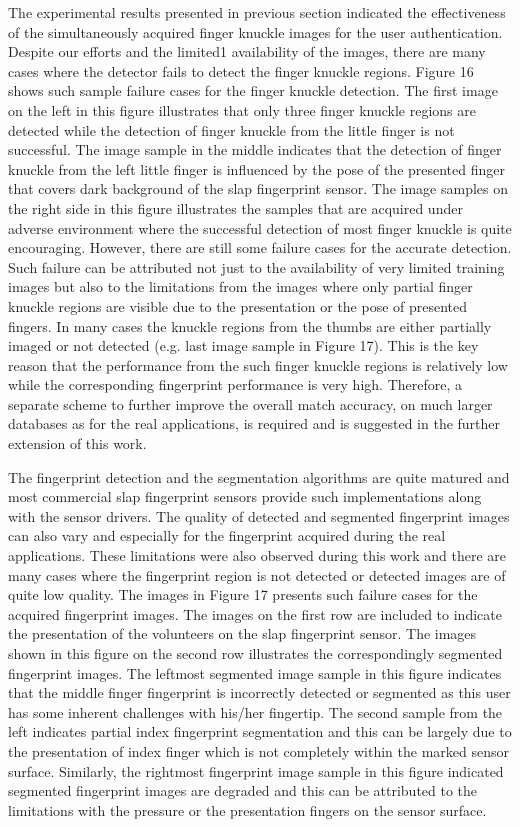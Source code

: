 The experimental results presented in previous section indicated the effectiveness of the simultaneously acquired finger knuckle images for the user authentication. Despite our efforts and the limited1 availability of the images, there are many cases where the detector fails to detect the finger knuckle regions. Figure 16 shows such sample failure cases for the finger knuckle detection. The first image on the left in this figure illustrates that only three finger knuckle regions are detected while the detection of finger knuckle from the little finger is not successful. The image sample in the middle indicates that the detection of finger knuckle from the left little finger is influenced by the pose of the presented finger that covers dark background of the slap fingerprint sensor. The image samples on the right side in this figure illustrates the samples that are acquired under adverse environment where the successful detection of most finger knuckle is quite encouraging. However, there are still some failure cases for the accurate detection. Such failure can be attributed not just to the availability of very limited training images but also to the limitations from the images where only partial finger knuckle regions are visible due to the presentation or the pose of presented fingers.  In many cases the knuckle regions from the thumbs are either partially imaged or not detected (e.g. last image sample in Figure 17). This is the key reason that the performance from the such finger knuckle regions is relatively low while the corresponding fingerprint performance is very high. Therefore, a separate scheme to further improve the overall match accuracy, on much larger databases as for the real applications, is required and is suggested in the further extension of this work.

The fingerprint detection and the segmentation algorithms are quite matured and most commercial slap fingerprint sensors provide such implementations along with the sensor drivers. The quality of detected and segmented fingerprint images can also vary and especially for the fingerprint acquired during the real applications. These limitations were also observed during this work and there are many cases where the fingerprint region is not detected or detected images are of quite low quality. The images in Figure 17 presents such failure cases for the acquired fingerprint images. The images on the first row are included to indicate the presentation of the volunteers on the slap fingerprint sensor.  The images shown in this figure on the second row illustrates the correspondingly segmented fingerprint images. The leftmost segmented image sample in this figure indicates that the middle finger fingerprint is incorrectly detected or segmented as this user has some inherent challenges with his/her fingertip. The second sample from the left indicates partial index fingerprint segmentation and this can be largely due to the presentation of index finger which is not completely within the marked sensor surface.  Similarly, the rightmost fingerprint image sample in this figure indicated segmented fingerprint images are degraded and this can be attributed to the limitations with the pressure or the presentation fingers on the sensor surface. 